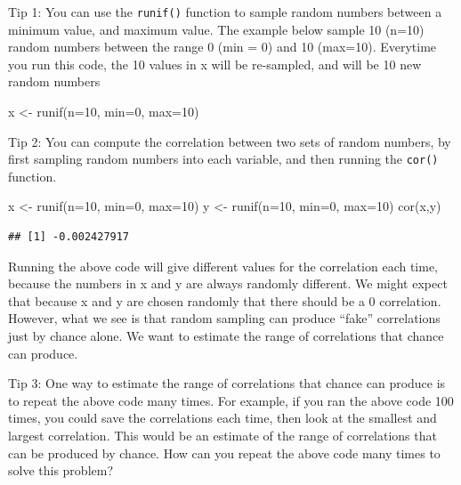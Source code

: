 \documentclass[
]{book}
\newenvironment{Shaded}{\begin{snugshade}}{\end{snugshade}}
\newcommand{\AttributeTok}[1]{\textcolor[rgb]{0.77,0.63,0.00}{#1}}
\newcommand{\DecValTok}[1]{\textcolor[rgb]{0.00,0.00,0.81}{#1}}
\newcommand{\FunctionTok}[1]{\textcolor[rgb]{0.00,0.00,0.00}{#1}}
\newcommand{\NormalTok}[1]{#1}
\newcommand{\OtherTok}[1]{\textcolor[rgb]{0.56,0.35,0.01}{#1}}
\begin{document}
Tip 1: You can use the \texttt{runif()} function to sample random numbers between a minimum value, and maximum value. The example below sample 10 (n=10) random numbers between the range 0 (min = 0) and 10 (max=10). Everytime you run this code, the 10 values in x will be re-sampled, and will be 10 new random numbers

\begin{Shaded}
\begin{Highlighting}[]
\NormalTok{x }\OtherTok{\textless{}{-}} \FunctionTok{runif}\NormalTok{(}\AttributeTok{n=}\DecValTok{10}\NormalTok{, }\AttributeTok{min=}\DecValTok{0}\NormalTok{, }\AttributeTok{max=}\DecValTok{10}\NormalTok{)}
\end{Highlighting}
\end{Shaded}

Tip 2: You can compute the correlation between two sets of random numbers, by first sampling random numbers into each variable, and then running the \texttt{cor()} function.

\begin{Shaded}
\begin{Highlighting}[]
\NormalTok{x }\OtherTok{\textless{}{-}} \FunctionTok{runif}\NormalTok{(}\AttributeTok{n=}\DecValTok{10}\NormalTok{, }\AttributeTok{min=}\DecValTok{0}\NormalTok{, }\AttributeTok{max=}\DecValTok{10}\NormalTok{)}
\NormalTok{y }\OtherTok{\textless{}{-}} \FunctionTok{runif}\NormalTok{(}\AttributeTok{n=}\DecValTok{10}\NormalTok{, }\AttributeTok{min=}\DecValTok{0}\NormalTok{, }\AttributeTok{max=}\DecValTok{10}\NormalTok{)}
\FunctionTok{cor}\NormalTok{(x,y)}
\end{Highlighting}
\end{Shaded}

\begin{verbatim}
## [1] -0.002427917
\end{verbatim}

Running the above code will give different values for the correlation each time, because the numbers in x and y are always randomly different. We might expect that because x and y are chosen randomly that there should be a 0 correlation. However, what we see is that random sampling can produce ``fake'' correlations just by chance alone. We want to estimate the range of correlations that chance can produce.

Tip 3: One way to estimate the range of correlations that chance can produce is to repeat the above code many times. For example, if you ran the above code 100 times, you could save the correlations each time, then look at the smallest and largest correlation. This would be an estimate of the range of correlations that can be produced by chance. How can you repeat the above code many times to solve this problem?
\end{document}
